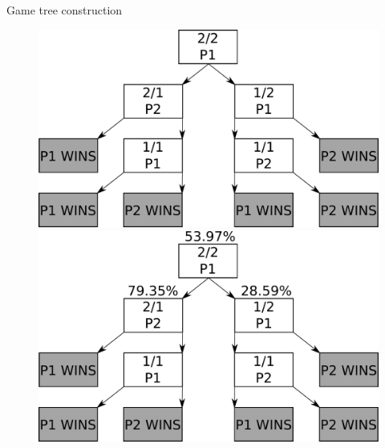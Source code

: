 \documentclass[10pt]{beamer}
\begin{document}
\begin{frame}{Game tree construction}
\begin{figure}
    \begin{overprint}
    \includegraphics[width=\textwidth]{images/2_dice_game_tree.pdf}
    \includegraphics[width=\textwidth]{images/2_dice_game_tree_rates.pdf}
    \end{overprint}
\end{figure}
\end{frame}
\end{document}
